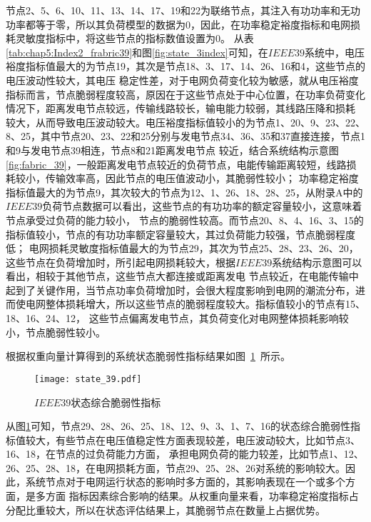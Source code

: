 节点2、5、6、10、11、13、14、17、19和22为联络节点，其注入有功功率和无功功率都等于零，所以其负荷模型的数据为0，因此，在功率稳定裕度指标和电网损耗灵敏度指标中，将这些节点的指标数值设置为0。
从表\ref{tab:chap5:Index2_frabric39}和图\ref{fig:state_3index}可知，在$IEEE39$系统中，电压裕度指标值最大的为节点19，其次是节点18、3、17、14、26、16和4，这些节点的电压波动性较大，其电压
稳定性差，对于电网负荷变化较为敏感，就从电压裕度指标而言，节点脆弱程度较高，原因在于这些节点处于中心位置，在功率负荷变化情况下，距离发电节点较远，传输线路较长，输电能力较弱，其线路压降和损耗
较大，从而导致电压波动较大。电压裕度指标值较小的为节点1、20、9、23、22、8、25，其中节点20、23、22和25分别与发电节点34、36、35和37直接连接，节点1和9与发电节点39相连，节点8和21距离发电节点
较近，结合系统结构示意图\ref{fig:fabric_39}，一般距离发电节点较近的负荷节点，电能传输距离较短，线路损耗较小，传输效率高，因此节点的电压值波动小，其脆弱性较小；
功率稳定裕度指标值最大的为节点9，其次较大的节点为12、1、26、18、28、25，从附录A中的$IEEE39$负荷节点数据可以看出，这些节点的有功功率的额定容量较小，这意味着节点承受过负荷的能力较小，
节点的脆弱性较高。而节点20、8、4、16、3、15的指标值较小，节点的有功功率额定容量较大，其过负荷能力较强，节点脆弱程度低；
电网损耗灵敏度指标值最大的为节点29，其次为节点25、28、23、26、20，这些节点在负荷增加时，所引起电网损耗较大，根据$IEEE39$系统结构示意图可以看出，相较于其他节点，这些节点大都连接或距离发电
节点较近，在电能传输中起到了关键作用，当节点功率负荷增加时，会很大程度影响到电网的潮流分布，进而使电网整体损耗增大，所以这些节点的脆弱程度较大。指标值较小的节点有15、18、16、24、12，
这些节点偏离发电节点，其负荷变化对电网整体损耗影响较小，节点脆弱性较小。


根据权重向量计算得到的系统状态脆弱性指标结果如图~\ref{fig:state_39}~所示。
\begin{figure}[H] %
  \centering
  \texttt{[image: state\_39.pdf]}
  \caption{$IEEE39$状态综合脆弱性指标}
  \label{fig:state_39}
\end{figure}
从图\ref{fig:state_39}可知，节点29、28、26、25、18、12、9、3、1、7、16的状态综合脆弱性指标值较大，有些节点在电压值稳定性方面表现较差，电压波动较大，比如节点3、16、18，在节点的过负荷能力方面，
承担电网负荷的能力较差，比如节点1、12、26、25、28、18，在电网损耗方面，节点29、25、28、26对系统的影响较大。因此，系统节点对于电网运行状态的影响时多方面的，其影响表现在一个或多个方面，是多方面
指标因素综合影响的结果。从权重向量来看，功率稳定裕度指标占分配比重较大，所以在状态评估结果上，其脆弱节点在数量上占据优势。

